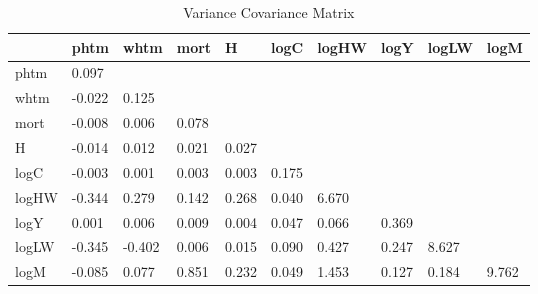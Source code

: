 \begin{table}[htbp]
\caption{\label{clabel} Variance Covariance Matrix}\centering\medskip
\begin{tabular}{llllllllll} \hline \hline
 & phtm  & whtm  & mort  & H  & logC  & logHW  & logY  & logLW  & logM  \\  \hline 
phtm &     0.097 \\  
whtm &    -0.022 &     0.125 \\  
mort &    -0.008 &     0.006 &     0.078 \\  
H &    -0.014 &     0.012 &     0.021 &     0.027 \\  
logC &    -0.003 &     0.001 &     0.003 &     0.003 &     0.175 \\  
logHW &    -0.344 &     0.279 &     0.142 &     0.268 &     0.040 &     6.670 \\  
logY &     0.001 &     0.006 &     0.009 &     0.004 &     0.047 &     0.066 &     0.369 \\  
logLW &    -0.345 &    -0.402 &     0.006 &     0.015 &     0.090 &     0.427 &     0.247 &     8.627 \\  
logM &    -0.085 &     0.077 &     0.851 &     0.232 &     0.049 &     1.453 &     0.127 &     0.184 &     9.762 \\  
\hline \hline \end{tabular}
\end{table}
